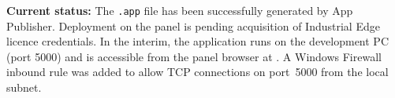 \textbf{Current status:} The \texttt{.app} file has been successfully generated by
App Publisher. Deployment on the panel is pending acquisition of Industrial Edge licence
credentials. In the interim, the application runs on the development PC (port 5000) and is
accessible from the panel browser at . A Windows Firewall
inbound rule was added to allow TCP connections on port~5000 from the local subnet.
